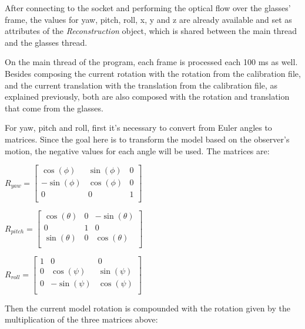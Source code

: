 \documentclass[msc, a4paper, classic, en]{ufbathesis}
\begin{document}
After connecting to the socket and performing the optical flow over the glasses' frame, the values for yaw, pitch, roll, x, y and z are already available and set as attributes of the \textit{Reconstruction} object, which is shared between the main thread and the glasses thread.

On the main thread of the program, each frame is processed each 100 ms as well. Besides composing the current rotation with the rotation from the calibration file, and the current translation with the translation from the calibration file, as explained previously, both are also composed with the rotation and translation that come from the glasses.

For yaw, pitch and roll, first it's necessary to convert from Euler angles to matrices. Since the goal here is to transform the model based on the observer's motion, the negative values for each angle will be used. The matrices are:

\begin{center}
$R_{yaw} = \begin{bmatrix}
           \cos(\phi) & \sin(\phi) & 0 \\
           -\sin(\phi) & \cos(\phi) & 0 \\
           0 & 0 & 1 \\
           \end{bmatrix}$
\end{center}

\begin{center}
$R_{pitch} = \begin{bmatrix}
             \cos(\theta) & 0 & -\sin(\theta) \\
             0 & 1 & 0 \\
             \sin(\theta) & 0 & \cos(\theta) \\
             \end{bmatrix}$
\end{center}

\begin{center}
$R_{roll} = \begin{bmatrix}
            1 & 0 & 0 \\
            0 & \cos(\psi) & \sin(\psi) \\
            0 & -\sin(\psi) & \cos(\psi) \\
            \end{bmatrix}$
\end{center}

Then the current model rotation is compounded with the rotation given by the multiplication of the three matrices above:
\end{document}
